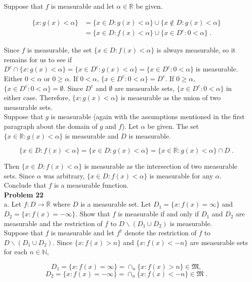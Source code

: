 \documentclass[a4paper]{article}
\begin{document}
Suppose that $f$ is measurable and let $\alpha \in \mathbb{R}$ be given. 

\begin{align*}
\{x : g(x) < \alpha\} &= \{x \in D : g(x) < \alpha\} \cup \{x \not\in D : g(x) < \alpha\} \\
&= \{x \in D : f(x) < \alpha\} \cup \{x \in D^c : 0 < \alpha\} \;. 
\end{align*}

Since $f$ is measurable, the set $\{x \in D : f(x) < \alpha\}$ is always measurable, so it remains for us to see if $D^c \cap \{x : g(x) < \alpha\} = \{x  \in D^c : g(x) < \alpha\} = \{x \in D^c : 0< \alpha\}$ is measurable. Either $0 < \alpha$ or $0\geq \alpha$. If $0 < \alpha$, $\{x \in D^c : 0<\alpha\} = D^c$. If $0 \geq \alpha$, $\{x \in D^c : 0 < \alpha\} = \emptyset$. Since $D^c$ and $\emptyset$ are measurable sets, $\{x \in D^c : 0 < \alpha\}$ in either case. Therefore, $\{x : g(x) < \alpha\}$ is measurable as the union of two measurable sets. \\

Suppose that $g$ is measurable (again with the assumptions mentioned in the first paragraph about the domain of $g$ and $f$). Let $\alpha$ be given. The set $\{x \in \mathbb{R} : g(x) < \alpha\}$ is measurable and $D$ is measurable.

$$\{x \in D : f(x) < \alpha\} = \{x \in D : g(x) < \alpha\} = \{x \in \mathbb{R} : g(x) < \alpha\} \cap D \;.$$

Then $\{x \in D: f(x) < \alpha\}$ is measurable as the intersection of two measurable sets. Since $\alpha$ was arbitrary, $\{x \in D : f(x) < \alpha\}$ is measurable for any $\alpha$. Conclude that $f$ is a measurable function. \\

{\bf Problem 22}\\

a. Let $f : D \rightarrow \overline{\mathbb{R}}$ where $D$ is a measurable set. Let $D_1 = \{x : f(x) = \infty\}$ and $D_2 = \{x : f(x) = -\infty\}$. Show that $f$ is measurable if and only if $D_1$ and $D_2$ are measurable and the restriction of $f$ to $D \backslash (D_1 \cup D_2)$ is measurable. \\

Suppose that $f$ is measurable and let $f^\dagger$ denote the restriction of $f$ to $D \backslash (D_1 \cup D_2)$. Since $\{x : f(x) > n\}$ and $\{x : f(x) < -n\}$ are measurable sets for each $n \in \mathbb{N}$,

$$D_1 = \{x : f(x) = \infty\} = \cap_n \{x : f(x) > n\} \in \mathfrak{M},$$
$$D_2 = \{x : f(x) = -\infty\} = \cap_n \{x : f(x) < -n \} \in \mathfrak{M} \;.$$
\end{document}
